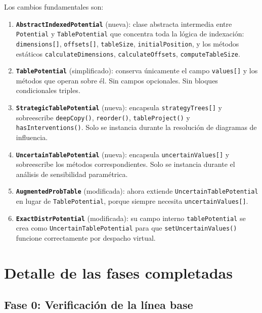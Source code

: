 \documentclass[11pt,a4paper]{article}
\newcommand{\code}[1]{\texttt{#1}}
\begin{document}
Los cambios fundamentales son:

\begin{enumerate}
  \item \textbf{\code{AbstractIndexedPotential}} (nueva): clase abstracta intermedia
        entre \code{Potential} y \code{TablePotential} que concentra toda la lógica
        de indexación: \code{dimensions[]}, \code{offsets[]}, \code{tableSize},
        \code{initialPosition}, y los métodos estáticos \code{calculateDimensions},
        \code{calculateOffsets}, \code{computeTableSize}.

  \item \textbf{\code{TablePotential}} (simplificado): conserva únicamente el campo
        \code{values[]} y los métodos que operan sobre él.  Sin campos opcionales.
        Sin bloques condicionales triples.

  \item \textbf{\code{StrategicTablePotential}} (nueva): encapsula
        \code{strategyTrees[]} y sobreescribe \code{deepCopy()}, \code{reorder()},
        \code{tableProject()} y \code{hasInterventions()}.  Solo se instancia
        durante la resolución de diagramas de influencia.

  \item \textbf{\code{UncertainTablePotential}} (nueva): encapsula
        \code{uncertainValues[]} y sobreescribe los métodos correspondientes.
        Solo se instancia durante el análisis de sensibilidad paramétrica.

  \item \textbf{\code{AugmentedProbTable}} (modificada): ahora extiende
        \code{UncertainTablePotential} en lugar de \code{TablePotential}, porque
        siempre necesita \code{uncertainValues[]}.

  \item \textbf{\code{ExactDistrPotential}} (modificada): su campo interno
        \code{tablePotential} se crea como \code{UncertainTablePotential} para que
        \code{setUncertainValues()} funcione correctamente por despacho virtual.
\end{enumerate}

\section{Detalle de las fases completadas}
\label{sec:fases}

\subsection{Fase 0: Verificación de la línea base}
\end{document}
